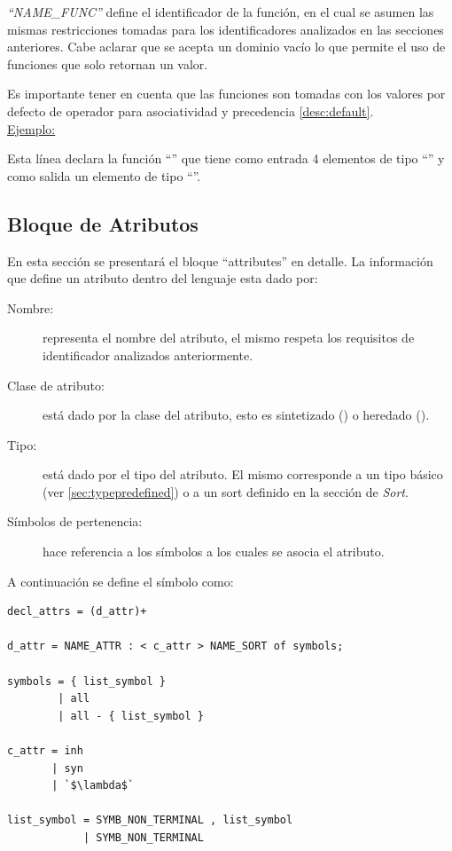 \textit{``NAME\_FUNC''} define el identificador de la función, en el cual se asumen las mismas restricciones tomadas para los identificadores analizados en las secciones anteriores. Cabe aclarar que se acepta un dominio vacío lo que permite el uso de funciones que solo retornan un valor.

Es importante tener en cuenta que las funciones son tomadas con los valores por defecto de operador para asociatividad y precedencia \ref{desc:default}.\\

\underline{Ejemplo:}\ \begin{center}
                                                                           \end{center}
\vspace{0.2cm}
Esta línea declara la función ``'' que tiene como entrada 4 elementos de tipo ``'' y como salida un elemento de tipo ``''.

\subsection{Bloque de Atributos}
En esta sección se presentará el bloque ``attributes'' en detalle. La información que define un atributo dentro del lenguaje esta dado por: 

\begin{description}
\item [Nombre:] representa el nombre del atributo, el mismo respeta los requisitos de identificador analizados anteriormente.

\item [Clase de atributo:] está dado por la clase del atributo, esto es sintetizado () o heredado ().

\item [Tipo:] está dado por el tipo del atributo. El mismo corresponde a un tipo básico (ver \ref{sec:typepredefined}) o a un sort definido en la sección de \textit{Sort}.

\item [Símbolos de pertenencia:] hace referencia a los símbolos a los cuales se asocia el atributo.
\end{description}

A continuación se define el símbolo  como:

\begin{lstlisting}[frame=shadowbox, language=specmag, linewidth=11cm]
decl_attrs = (d_attr)+

d_attr = NAME_ATTR : < c_attr > NAME_SORT of symbols;

symbols = { list_symbol }
        | all
        | all - { list_symbol }

c_attr = inh
       | syn
       | `$\lambda$`

list_symbol = SYMB_NON_TERMINAL , list_symbol
            | SYMB_NON_TERMINAL 
\end{lstlisting}


